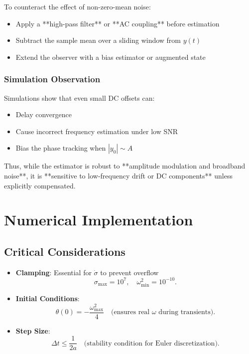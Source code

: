 \documentclass[12pt,letterpaper]{article}
\begin{document}
To counteract the effect of non-zero-mean noise:

\begin{itemize}
  \item Apply a **high-pass filter** or **AC coupling** before estimation
  \item Subtract the sample mean over a sliding window from \(y(t)\)
  \item Extend the observer with a bias estimator or augmented state
\end{itemize}

\subsubsection*{Simulation Observation}

Simulations show that even small DC offsets can:
\begin{itemize}
  \item Delay convergence
  \item Cause incorrect frequency estimation under low SNR
  \item Bias the phase tracking when \(|y_0| \sim A\)
\end{itemize}

Thus, while the estimator is robust to **amplitude modulation and broadband noise**, it is **sensitive to low-frequency drift or DC components** unless explicitly compensated.

\section{Numerical Implementation}

\subsection{Critical Considerations}
\begin{itemize}
  \item \textbf{Clamping}: Essential for \(\dot{\sigma}\) to prevent overflow  
  \[
    \sigma_{\max} = 10^7,\quad \omega_{\min}^2 = 10^{-10}.
  \]
  \item \textbf{Initial Conditions}:
  \[
    \theta(0) = -\frac{\omega_{\max}^2}{4}
    \quad\text{(ensures real \(\omega\) during transients)}.
  \]
  \item \textbf{Step Size}:
  \[
    \Delta t \le \frac{1}{2a}
    \quad\text{(stability condition for Euler discretization)}.
  \]
\end{itemize}
\end{document}
